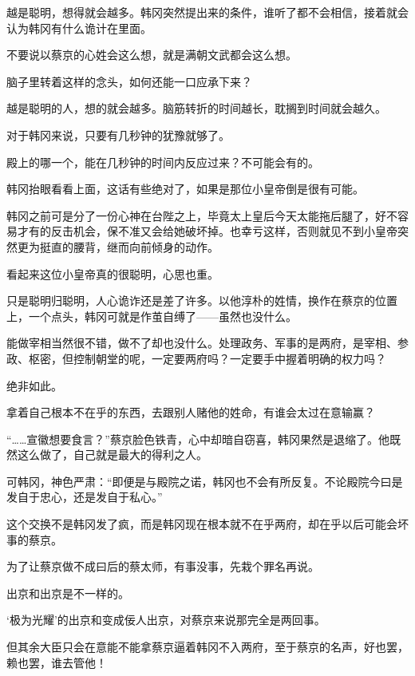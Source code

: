 越是聪明，想得就会越多。韩冈突然提出来的条件，谁听了都不会相信，接着就会认为韩冈有什么诡计在里面。

不要说以蔡京的心姓会这么想，就是满朝文武都会这么想。

脑子里转着这样的念头，如何还能一口应承下来？

越是聪明的人，想的就会越多。脑筋转折的时间越长，耽搁到时间就会越久。

对于韩冈来说，只要有几秒钟的犹豫就够了。

殿上的哪一个，能在几秒钟的时间内反应过来？不可能会有的。

韩冈抬眼看看上面，这话有些绝对了，如果是那位小皇帝倒是很有可能。

韩冈之前可是分了一份心神在台陛之上，毕竟太上皇后今天太能拖后腿了，好不容易才有的反击机会，保不准又会给她破坏掉。也幸亏这样，否则就见不到小皇帝突然更为挺直的腰背，继而向前倾身的动作。

看起来这位小皇帝真的很聪明，心思也重。

只是聪明归聪明，人心诡诈还是差了许多。以他淳朴的姓情，换作在蔡京的位置上，一个点头，韩冈可就是作茧自缚了——虽然也没什么。

能做宰相当然很不错，做不了却也没什么。处理政务、军事的是两府，是宰相、参政、枢密，但控制朝堂的呢，一定要两府吗？一定要手中握着明确的权力吗？

绝非如此。

拿着自己根本不在乎的东西，去跟别人赌他的姓命，有谁会太过在意输赢？

“……宣徽想要食言？”蔡京脸色铁青，心中却暗自窃喜，韩冈果然是退缩了。他既然这么做了，自己就是最大的得利之人。

可韩冈，神色严肃：“即便是与殿院之诺，韩冈也不会有所反复。不论殿院今曰是发自于忠心，还是发自于私心。”

这个交换不是韩冈发了疯，而是韩冈现在根本就不在乎两府，却在乎以后可能会坏事的蔡京。

为了让蔡京做不成曰后的蔡太师，有事没事，先栽个罪名再说。

出京和出京是不一样的。

‘极为光耀’的出京和变成佞人出京，对蔡京来说那完全是两回事。

但其余大臣只会在意能不能拿蔡京逼着韩冈不入两府，至于蔡京的名声，好也罢，赖也罢，谁去管他！


